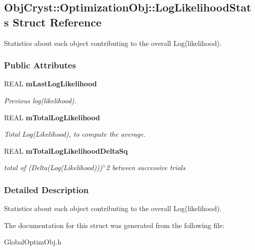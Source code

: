 \subsection{ObjCryst::OptimizationObj::LogLikelihoodStats Struct Reference}
\label{a00037}


Statistics about each object contributing to the overall Log(likelihood).  
\subsubsection*{Public Attributes}
\begin{DoxyCompactItemize}
\item 
REAL {\bf mLastLogLikelihood}\label{a00037_ab7ca39bcc656b2c92cfde1dedc33b7d0}

\begin{DoxyCompactList}\small\item\em Previous log(likelihood). \item\end{DoxyCompactList}\item 
REAL {\bf mTotalLogLikelihood}\label{a00037_a2bcf5607d7bf66fc816cc8e550eef463}

\begin{DoxyCompactList}\small\item\em Total Log(Likelihood), to compute the average. \item\end{DoxyCompactList}\item 
REAL {\bf mTotalLogLikelihoodDeltaSq}\label{a00037_a0b6e826d8f5e0e5a99abc1d52caa6876}

\begin{DoxyCompactList}\small\item\em total of (Delta(Log(Likelihood)))$^\wedge$2 between successive trials \item\end{DoxyCompactList}\end{DoxyCompactItemize}


\subsubsection{Detailed Description}
Statistics about each object contributing to the overall Log(likelihood). 

The documentation for this struct was generated from the following file:\begin{DoxyCompactItemize}
\item 
GlobalOptimObj.h\end{DoxyCompactItemize}
